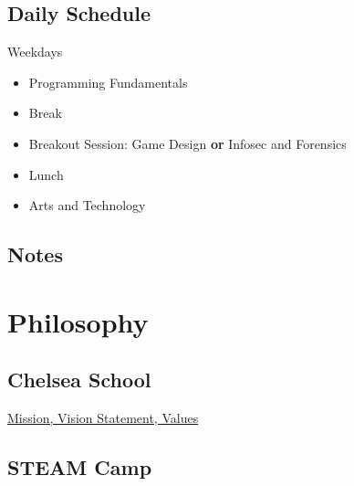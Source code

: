 \documentclass[letterpaper,10pt,english]{sphinxmanual}
\begin{document}
\section{Daily Schedule}
\label{description:daily-schedule}
Weekdays
\begin{itemize}
\item {} 
Programming Fundamentals

\item {} 
Break

\item {} 
Breakout Session: Game Design \textbf{or} Infosec and Forensics

\item {} 
Lunch

\item {} 
Arts and Technology

\end{itemize}


\section{Notes}
\label{description:notes}

\chapter{Philosophy}
\label{philosophy::doc}\label{philosophy:philosophy}\label{philosophy:index-0}

\section{Chelsea School}
\label{philosophy:chelsea-school}
\href{http://chelseaschool.edu/about/philosophy}{Mission, Vision Statement, Values}


\section{STEAM Camp}
\label{philosophy:steam-camp}
\end{document}
